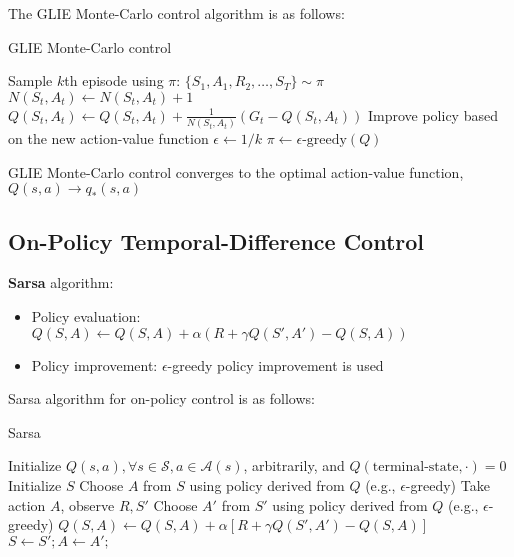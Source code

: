 \noindent The GLIE Monte-Carlo control algorithm is as follows:

\begin{algorithm}[H]
    \caption{GLIE Monte-Carlo control}
    \begin{algorithmic}
        \State Sample $k$th episode using $\pi$: $\{S_1, A_1, R_2, \dots, S_T\} \sim \pi$
        \State $N(S_t, A_t) \leftarrow N(S_t, A_t) + 1$
        \State $Q(S_t, A_t) \leftarrow Q(S_t, A_t) + \frac{1}{N(S_t, A_t)} (G_t - Q(S_t, A_t))$
        \EndFor
        \State Improve policy based on the new action-value function
        \State $\epsilon \leftarrow 1/k$
        \State $\pi \leftarrow \epsilon\text{-greedy}(Q)$
    \end{algorithmic}
\end{algorithm}

\noindent GLIE Monte-Carlo control converges to the optimal action-value function, $Q(s,
    a) \rightarrow q_*(s, a)$

\subsection{On-Policy Temporal-Difference Control}

\textbf{Sarsa} algorithm:

\begin{itemize}
    \item Policy evaluation: $Q(S, A) \leftarrow Q(S, A) + \alpha (R + \gamma Q(S', A') -
              Q(S, A))$
    \item Policy improvement: $\epsilon$-greedy policy improvement is used
\end{itemize}

\noindent Sarsa algorithm for on-policy control is as follows:

\begin{algorithm}[H]
    \caption{Sarsa}
    \begin{algorithmic}
        \State Initialize $Q(s, a), \forall s \in \mathcal{S}, a \in \mathcal{A}(s)$, arbitrarily, and $Q(\text{terminal-state}, \cdot) = 0$
        \State Initialize $S$
        \State Choose $A$ from $S$ using policy derived from $Q$ (e.g., $\epsilon$-greedy)
        \State Take action $A$, observe $R, S'$
        \State Choose $A'$ from $S'$ using policy derived from $Q$ (e.g., $\epsilon$-greedy)
        \State $Q(S, A) \leftarrow Q(S, A) + \alpha[R + \gamma Q(S', A') - Q(S, A)]$
        \State $S \leftarrow S'; A \leftarrow A';$
    \end{algorithmic}
\end{algorithm}

